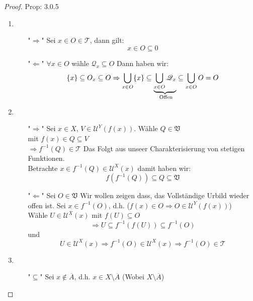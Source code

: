 \begin{proof}{Prop: 3.0.5}\\
\begin{enumerate}
    \item 
    \begin{itemize}
        \item["$\Rightarrow$"] 
        Sei $x \in O \in \mathcal{T}$, dann gilt:
        $$
        x \in O \subseteq 0
        $$
        \item["$\Leftarrow$"] 
        $\forall x \in O$ wähle $\mathscr{Q}_x \subseteq O$ 
        Dann haben wir:
        $$
            \{x\} \subseteq O_x \subseteq O\\
             \Rightarrow 
            \bigcup_{x \in O} \{x\} \subseteq 
            \underbrace{\bigcup_{x \in O} \mathscr{Q}_x}_{\text{ Offen}} \subseteq 
            \bigcup_{x \in O} O = O
        $$
    \end{itemize}
    \item    
    \begin{itemize}
        \item["$\Rightarrow$"] 
        Sei $x \in X$, $V \in \mathscr{U}^Y(f(x))$. Wähle $Q \in \mathfrak{V}$ \\
        mit $f(x) \in Q \subseteq V$ \\
        $\Rightarrow f^{-1}(Q) \in \mathcal{T}$  Das Folgt aus unseer Charakterisierung
        von stetigen Funktionen. \\
        Betrachte $x \in f^{-1}(Q) \in \mathscr{U}^X(x)$ damit haben wir:
        $$
        f(f^{-1}(Q)) \subseteq Q \subseteq \mathfrak{V}
        $$
        \item["$\Leftarrow$"]
        Sei $O \in \mathfrak{V}$ 
        Wir wollen zeigen dass, das Vollständige Urbild wieder offen ist.
        Sei $x \in f^{-1}(O)$, d.h. ($f(x) \in O \Rightarrow O 
        \in \mathscr{U}^Y(f(x))$) \\
        Wähle $U \in \mathscr{U}^X(x)$ mit $f(U) \subseteq O$ \\
        $$\Rightarrow U \subseteq f^{-1}(f(U)) \subseteq f^{-1}(O)$$
        und 
        $$U\in \mathscr{U}^X(x) \Rightarrow f^{-1}(O) \in \mathscr{U}^X(x)
        \Rightarrow f^{-1}(O) \in \mathcal{T}$$
    \end{itemize}
    \item
    \begin{itemize}
        \item["$\subseteq$"]
        Sei $x \notin \overline{A}$, d.h. 
        $x \in X\setminus \overline{A}$ (Wobei $ X \setminus \overline{A}$) 

\end{itemize}
\end{enumerate}
\end{proof}
